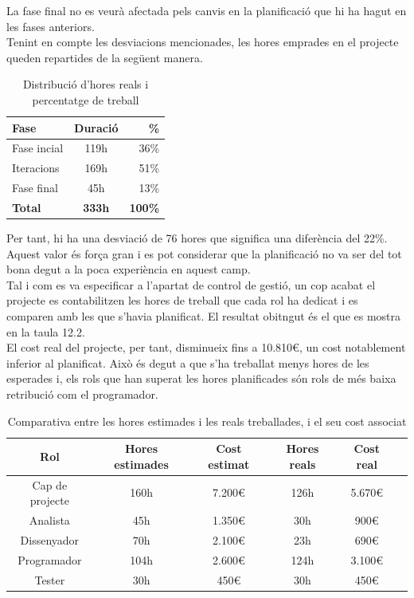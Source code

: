 La fase final no es veurà afectada pels canvis en la planificació que hi ha hagut en les fases anteriors.\\

Tenint en compte les desviacions mencionades, les hores emprades en el projecte queden repartides de la següent manera.

\begin{table}[!h]
\centering
\begin{tabular}{|l|c|r|}
\hline
\textbf{Fase}  & \textbf{Duració} & \textbf{\%} \\\hline
Fase incial & 119h & 36\% \\\hline
Iteracions & 169h & 51\% \\\hline
Fase final & 45h & 13\% \\\hline
\textbf{Total} & \textbf{333h}  & \textbf{100\%} \\\hline
\end{tabular}
\label{}
\caption{Distribució d'hores reals i percentatge de treball}
\end{table}

Per tant, hi ha una desviació de 76 hores que significa una diferència del 22\%. Aquest valor és força gran i es pot considerar que la planificació no va ser del
tot bona degut a la poca experiència en aquest camp.\\

Tal i com es va especificar a l’apartat de control de gestió, un cop acabat el projecte es contabilitzen les hores de treball que cada rol ha dedicat i es comparen amb les que s’havia planificat. El resultat obitngut és el que es mostra en la
taula 12.2.\\

El cost real del projecte, per tant, disminueix fins a 10.810\euro, un cost notablement inferior al planificat. Això és degut a que s’ha treballat menys hores de
les esperades i, els rols que han superat les hores planificades són rols de més
baixa retribució com el programador.

\begin{table}[!h]
\centering
\begin{tabular}{|c|c|c|c|c|c|}
\hline
\textbf{Rol}  & \textbf{Hores estimades} & \textbf{Cost estimat} & \textbf{Hores reals} & \textbf{Cost real}   \\ \hline
Cap de projecte & 160h & 7.200\euro & 126h & 5.670\euro \\\hline
Analista & 45h & 1.350\euro & 30h & 900\euro \\\hline
Dissenyador & 70h & 2.100\euro & 23h & 690\euro \\\hline
Programador & 104h & 2.600\euro & 124h & 3.100\euro \\\hline
Tester & 30h & 450\euro & 30h & 450\euro \\\hline
\end{tabular} 
\label{}
\caption{Comparativa entre les hores estimades i les reals treballades, i el seu cost associat}
\end{table}

